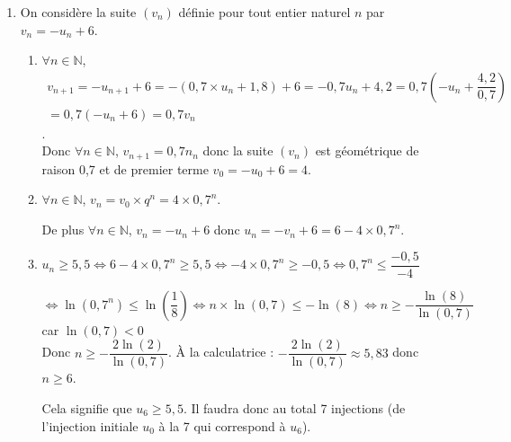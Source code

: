 \documentclass[10pt]{article}
\providecommand{\N}{\mathbb{N}}
\begin{document}
\begin{enumerate}
\begin{enumerate}
		$l=0,7l+1,8\iff 0,3l=1,8\iff l=6$. Donc $\displaystyle\lim\limits_{n \rightarrow +\infty} u_n=6$
	\end{enumerate}
\item On considère la suite $(v_n)$ définie pour tout entier naturel $n$ par $v_{n}=-u_{n}+6$.
\begin{enumerate}
	\item $\forall n\in \N$, $\begin{gathered}v_{n+1}=-u_{n+1}+6=-(0,7\times u_n+1,8)+6=-0,7u_n+4,2=0,7\left(-u_n+\dfrac{4,2}{0,7}\right)\\=0,7(-u_n+6)=0,7v_n\end{gathered}$.\\
	Donc $\forall n\in \N$, $v_{n+1}=0,7n_n$ donc la suite $\left(v_n\right)$  est géométrique de raison 0,7 et de premier terme $v_0=-u_0+6=4$.
	\item $\forall n\in \N$, $v_n=v_0 \times q^n=4 \times 0,7^n$.
	
De plus  $\forall n\in \N$, $v_n=-u_n+6$ donc $u_n=-v_n+6=6-4\times 0,7^n$.
	 \item $u_n\geqslant 5,5 \iff 6-4\times 0,7^n\geqslant 5,5 \iff -4\times 0,7^n\geqslant -0,5 \iff 0,7^n\leqslant \dfrac{-0,5}{-4}$

$\iff \ln\left(0,7^n\right) \leqslant \ln\left(\dfrac{1}{8}\right) \iff n\times \ln(0,7) \leqslant -\ln(8) \iff n\geqslant -\dfrac{\ln(8)}{\ln(0,7)}$ car $\ln(0,7)<0$\\
Donc $n\geqslant -\dfrac{2\ln(2)}{\ln(0,7)}$. À la calculatrice : $-\dfrac{2\ln(2)}{\ln(0,7)}\approx 5,83$ donc $n\geqslant 6$.

Cela signifie que $u_6\geqslant 5,5$. Il faudra donc au total 7 injections (de l'injection initiale $u_0$ à la 7 qui correspond à $u_6$).
\end{enumerate}
\end{enumerate}

\bigskip
\end{document}
